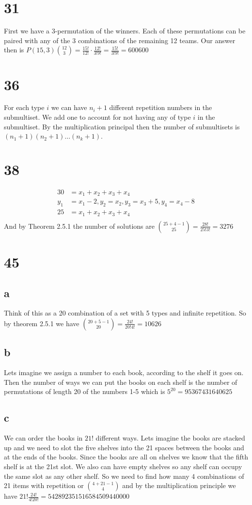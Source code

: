 \documentclass{article}
\begin{document}
\section*{31}
First we have a 3-permutation of the winners. Each of these permutations can be paired with any of the 3 combinations of the remaining 12 teams. Our answer then is $P(15,3){12 \choose 3}=\frac{15!}{12!}\cdot\frac{12!}{3!9!}=\frac{15!}{3!9!}=600600$
\section*{36}
For each type $i$ we can have $n_i+1$ different repetition numbers in the submultiset. We add one to account for not having any of type $i$ in the submultiset. By the multiplication principal then the number of submultisets is $(n_1+1)(n_2+1)\dots(n_k+1)$.
\section*{38}
\begin{align*}
  30&=x_1+x_2+x_3+x_4\\
  y_1&=x_1-2, y_2=x_2, y_3=x_3+5, y_4=x_4-8\\
  25&=x_1+x_2+x_3+x_4\\
\end{align*}
And by Theorem 2.5.1 the number of solutions are ${25+4-1 \choose 25}=\frac{28!}{25!3!}=3276$
\section*{45}
\subsection*{a}
Think of this as a 20 combination of a set with 5 types and infinite repetition. So by theorem 2.5.1 we have ${20+5-1 \choose 20}=\frac{24!}{20!4!}=10626$
\subsection*{b}
Lets imagine we assign a number to each book, according to the shelf it goes on. Then the number of ways we can put the books on each shelf is the number of permutations of length 20 of the numbers 1-5 which is $5^{20}=95367431640625$
\subsection*{c}
We can order the books in $21!$ different ways. Lets imagine the books are stacked up and we need to slot the five shelves into the 21 spaces between the books and at the ends of the books. Since the books are all on shelves we know that the fifth shelf is at the 21st slot. We also can have empty shelves so any shelf can occupy the same slot as any other shelf. So we need to find how many 4 combinations of 21 items with repetition or ${4+21-1 \choose 4}$ and by the multiplication principle we have $21!\frac{24!}{4!20!}=542892351516584509440000$
\end{document}
